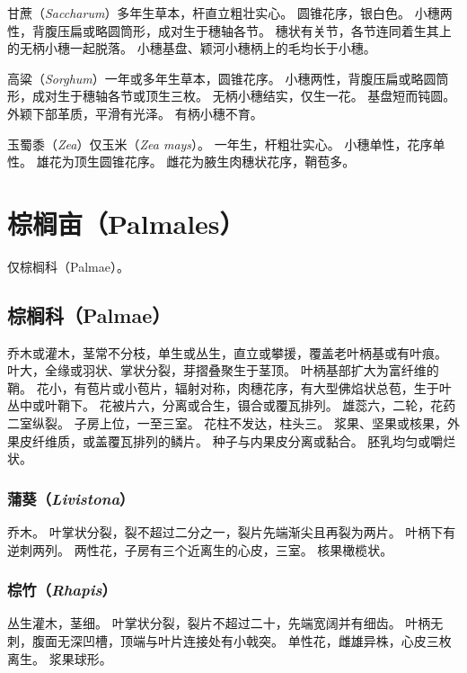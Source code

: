 \documentclass[11pt]{article}
\begin{document}
\begin{sloppypar}
\par

甘蔗（\textit{Saccharum}）多年生草本，杆直立粗壮实心。
圆锥花序，银白色。
小穗两性，背腹压扁或略圆筒形，成对生于穗轴各节。
穗状有关节，各节连同着生其上的无柄小穗一起脱落。
小穗基盘、颖河小穗柄上的毛均长于小穗。

\par

高粱（\textit{Sorghum}）一年或多年生草本，圆锥花序。
小穗两性，背腹压扁或略圆筒形，成对生于穗轴各节或顶生三枚。
无柄小穗结实，仅生一花。
基盘短而钝圆。
外颖下部革质，平滑有光泽。
有柄小穗不育。

\par

玉蜀黍（\textit{Zea}）仅玉米（\textit{Zea mays}）。
一年生，杆粗壮实心。
小穗单性，花序单性。
雄花为顶生圆锥花序。
雌花为腋生肉穗状花序，鞘苞多。

\section{棕榈亩（Palmales）}
仅棕榈科（Palmae）。

\subsection{棕榈科（Palmae）}
乔木或灌木，茎常不分枝，单生或丛生，直立或攀援，覆盖老叶柄基或有叶痕。
叶大，全缘或羽状、掌状分裂，芽摺叠聚生于茎顶。
叶柄基部扩大为富纤维的鞘。
花小，有苞片或小苞片，辐射对称，肉穗花序，有大型佛焰状总苞，生于叶丛中或叶鞘下。
花被片六，分离或合生，镊合或覆瓦排列。
雄蕊六，二轮，花药二室纵裂。
子房上位，一至三室。
花柱不发达，柱头三。
浆果、坚果或核果，外果皮纤维质，或盖覆瓦排列的鳞片。
种子与内果皮分离或黏合。
胚乳均匀或嚼烂状。

\subsubsection{蒲葵（\textit{Livistona}）}
乔木。
叶掌状分裂，裂不超过二分之一，裂片先端渐尖且再裂为两片。
叶柄下有逆刺两列。
两性花，子房有三个近离生的心皮，三室。
核果橄榄状。

\subsubsection{棕竹（\textit{Rhapis}）}
丛生灌木，茎细。
叶掌状分裂，裂片不超过二十，先端宽阔并有细齿。
叶柄无刺，腹面无深凹槽，顶端与叶片连接处有小戟突。
单性花，雌雄异株，心皮三枚离生。
浆果球形。


\end{sloppypar}
\end{document}
